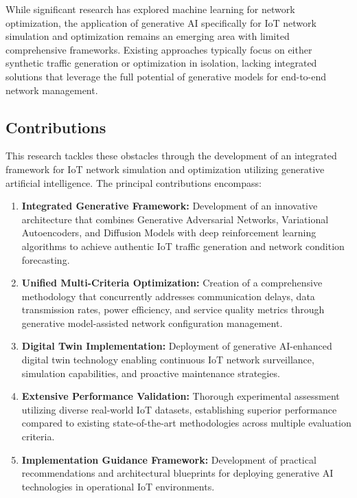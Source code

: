 \documentclass[conference]{IEEEtran}
\begin{document}
While significant research has explored machine learning for network optimization, the application of generative AI specifically for IoT network simulation and optimization remains an emerging area with limited comprehensive frameworks. Existing approaches typically focus on either synthetic traffic generation or optimization in isolation, lacking integrated solutions that leverage the full potential of generative models for end-to-end network management.

\subsection{Contributions}

This research tackles these obstacles through the development of an integrated framework for IoT network simulation and optimization utilizing generative artificial intelligence. The principal contributions encompass:

\begin{enumerate}
\item \textbf{Integrated Generative Framework:} Development of an innovative architecture that combines Generative Adversarial Networks, Variational Autoencoders, and Diffusion Models with deep reinforcement learning algorithms to achieve authentic IoT traffic generation and network condition forecasting.

\item \textbf{Unified Multi-Criteria Optimization:} Creation of a comprehensive methodology that concurrently addresses communication delays, data transmission rates, power efficiency, and service quality metrics through generative model-assisted network configuration management.

\item \textbf{Digital Twin Implementation:} Deployment of generative AI-enhanced digital twin technology enabling continuous IoT network surveillance, simulation capabilities, and proactive maintenance strategies.

\item \textbf{Extensive Performance Validation:} Thorough experimental assessment utilizing diverse real-world IoT datasets, establishing superior performance compared to existing state-of-the-art methodologies across multiple evaluation criteria.

\item \textbf{Implementation Guidance Framework:} Development of practical recommendations and architectural blueprints for deploying generative AI technologies in operational IoT environments.
\end{enumerate}
\end{document}
